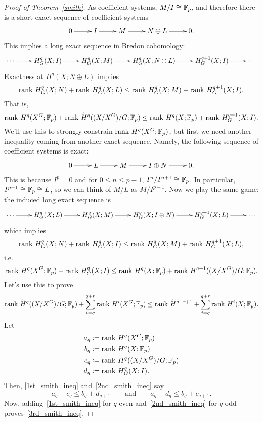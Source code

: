 \begin{proof}[Proof of Theorem~\ref{smith}]
As coefficient systems, $M/I\cong\mathbb F_p$, and therefore there is a short exact sequence of coefficient systems
\[\shortexact{I}{M}{N\oplus L}.\]
This implies a long exact sequence in Bredon cohomology:
\[\xymatrix{
	\dotsb\ar[r] & H_G^q(X;I)\ar[r] & H_G^q(X;M)\ar[r] & H_G^q(X;N\oplus L)\ar[r] & H_G^{q+1}(X;I)\ar[r] & \dotsb
}\]
Exactness at $H^q(X;N\oplus L)$ implies
\[\operatorname{rank\,} H_G^q(X;N) + \operatorname{rank\,} H_G^q(X;L) \le \operatorname{rank\,} H_G^q(X;M) + \operatorname{rank\,} H_G^{q+1}(X;I).\]
That is,
\begin{equation}
\label{1st_smith_ineq}
\operatorname{rank\,} H^q(X^G;\mathbb F_p) + \operatorname{rank\,}\widetilde H^q((X/X^G)/G;\mathbb F_p) \le \operatorname{rank\,} H^q(X;\mathbb F_p) + \operatorname{rank\,} H_G^{q+1}(X;I).
\end{equation}
We'll use this to strongly constrain $\operatorname{rank\,} H^q(X^G;\mathbb F_p)$, but first we need another inequality coming from
another exact sequence. Namely, the following sequence of coefficient systems is exact:
\[\shortexact{L}{M}{I\oplus N}.\]
This is because $I^p = 0$ and for $0\le n\le p-1$, $I^n/I^{n+1}\cong\mathbb F_p$. In particular, $I^{p-1}\cong\mathbb F_p\cong
L$, so we can think of $M/L$ as $M/I^{p-1}$. Now we play the same game: the induced long exact sequence is
\[\xymatrix{
	\dotsb\ar[r] & H_G^q(X;L)\ar[r] & H_G^q(X;M)\ar[r] & H_G^q(X;I\oplus N)\ar[r] & H_G^{q+1}(X;L)\ar[r] & \dotsb
}\]
which implies
\[\operatorname{rank\,} H_G^q(X;N) + \operatorname{rank\,} H_G^q(X;I) \le \operatorname{rank\,} H_G^q(X;M) + \operatorname{rank\,} H_G^{q+1}(X;L),\]
i.e.
\begin{equation}
\label{2nd_smith_ineq}
\operatorname{rank\,} H^q(X^G;\mathbb F_p) + \operatorname{rank\,} H_G^q(X;I) \le \operatorname{rank\,} H^q(X;\mathbb F_p) + \operatorname{rank\,} H^{q+1}((X/X^G)/G;\mathbb F_p).
\end{equation}
Let's use this to prove
\begin{equation}
\label{3rd_smith_ineq}
\operatorname{rank\,} \widetilde H^q((X/X^G)/G;\mathbb F_p) + \sum_{i=q}^{q+r} \operatorname{rank\,} H^i(X^G;\mathbb F_p) \le \operatorname{rank\,}\widetilde H^{q+r+1} + \sum_{i=q}^{q+r}\operatorname{rank\,}
H^i(X;\mathbb F_p).
\end{equation}
Let
\begin{align*}
	a_q &\coloneqq \operatorname{rank\,} H^q(X^G;\mathbb F_p)\\
	b_q &\coloneqq \operatorname{rank\,} H^q(X;\mathbb F_p)\\
	c_q &\coloneqq \operatorname{rank\,} H^q((X/X^G)/G;\mathbb F_p)\\
	d_q &\coloneqq \operatorname{rank\,} H_G^q(X;I).
\end{align*}
Then, \eqref{1st_smith_ineq} and~\eqref{2nd_smith_ineq} say
\[a_q + c_q\le b_q + d_{q+1}\qquad\text{and}\qquad a_q + d_q \le b_q + c_{q+1}.\]
Now, adding~\eqref{1st_smith_ineq} for $q$ even and~\eqref{2nd_smith_ineq} for $q$ odd
proves~\eqref{3rd_smith_ineq}.


\end{proof}
